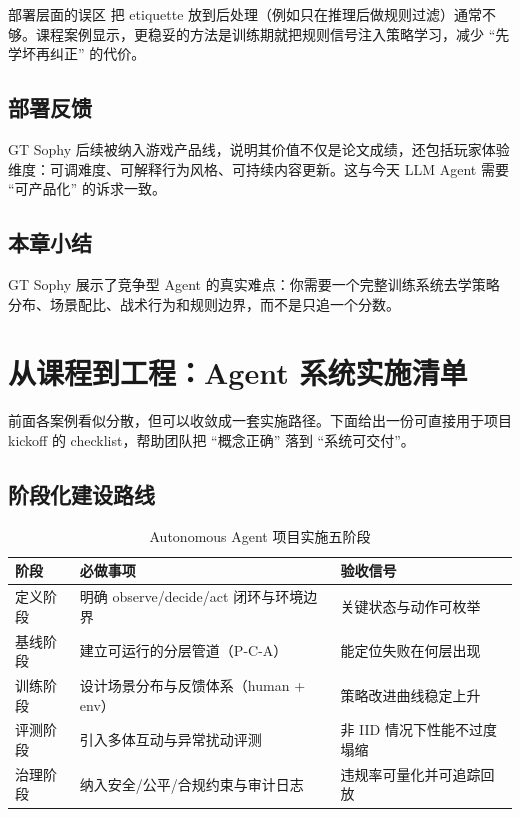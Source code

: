 \documentclass[a4paper]{article}
\begin{document}
\begin{warningbox}{部署层面的误区}
把 etiquette 放到后处理（例如只在推理后做规则过滤）通常不够。课程案例显示，更稳妥的方法是训练期就把规则信号注入策略学习，减少 ``先学坏再纠正'' 的代价。
\end{warningbox}

\subsection{部署反馈}
GT Sophy 后续被纳入游戏产品线，说明其价值不仅是论文成绩，还包括玩家体验维度：可调难度、可解释行为风格、可持续内容更新。这与今天 LLM Agent 需要 ``可产品化'' 的诉求一致。

\subsection{本章小结}
GT Sophy 展示了竞争型 Agent 的真实难点：你需要一个完整训练系统去学策略分布、场景配比、战术行为和规则边界，而不是只追一个分数。

\section{从课程到工程：Agent 系统实施清单}

前面各案例看似分散，但可以收敛成一套实施路径。下面给出一份可直接用于项目 kickoff 的 checklist，帮助团队把 ``概念正确'' 落到 ``系统可交付''。

\subsection{阶段化建设路线}
\begin{table}[H]
\centering
\begin{tabular}{p{2.5cm}p{4.8cm}p{4.3cm}}
\toprule
\textbf{阶段} & \textbf{必做事项} & \textbf{验收信号} \\
\midrule
定义阶段 & 明确 observe/decide/act 闭环与环境边界 & 关键状态与动作可枚举 \\
基线阶段 & 建立可运行的分层管道（P-C-A） & 能定位失败在何层出现 \\
训练阶段 & 设计场景分布与反馈体系（human + env） & 策略改进曲线稳定上升 \\
评测阶段 & 引入多体互动与异常扰动评测 & 非 IID 情况下性能不过度塌缩 \\
治理阶段 & 纳入安全/公平/合规约束与审计日志 & 违规率可量化并可追踪回放 \\
\bottomrule
\end{tabular}
\caption{Autonomous Agent 项目实施五阶段}
\end{table}
\end{document}
